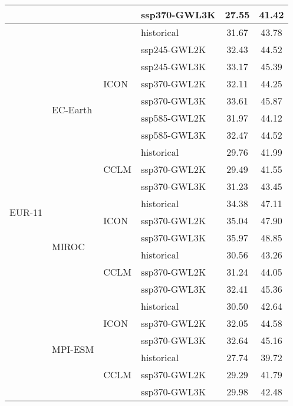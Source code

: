 \begin{table}[!htbp]
\begin{tabular}{lll|l|cc}
 &  &  & ssp370-GWL3K & 27.55 & 41.42 \\
\midrule
\multirow{22}{*}{EUR-11} & \multirow{10}{*}{EC-Earth} & \multirow{7}{*}{ICON} & historical & 31.67 & 43.78 \\
 &  &  & ssp245-GWL2K & 32.43 & 44.52 \\
 &  &  & ssp245-GWL3K & 33.17 & 45.39 \\
 &  &  & ssp370-GWL2K & 32.11 & 44.25 \\
 &  &  & ssp370-GWL3K & 33.61 & 45.87 \\
 &  &  & ssp585-GWL2K & 31.97 & 44.12 \\
 &  &  & ssp585-GWL3K & 32.47 & 44.52 \\
\cmidrule(lr){3-6}
 &  & \multirow{3}{*}{CCLM} & historical & 29.76 & 41.99 \\
 &  &  & ssp370-GWL2K & 29.49 & 41.55 \\
 &  &  & ssp370-GWL3K & 31.23 & 43.45 \\
\cmidrule(lr){3-6}
\cmidrule(lr){2-6}
 & \multirow{6}{*}{MIROC} & \multirow{3}{*}{ICON} & historical & 34.38 & 47.11 \\
 &  &  & ssp370-GWL2K & 35.04 & 47.90 \\
 &  &  & ssp370-GWL3K & 35.97 & 48.85 \\
\cmidrule(lr){3-6}
 &  & \multirow{3}{*}{CCLM} & historical & 30.56 & 43.26 \\
 &  &  & ssp370-GWL2K & 31.24 & 44.05 \\
 &  &  & ssp370-GWL3K & 32.41 & 45.36 \\
\cmidrule(lr){3-6}
\cmidrule(lr){2-6}
 & \multirow{6}{*}{MPI-ESM} & \multirow{3}{*}{ICON} & historical & 30.50 & 42.64 \\
 &  &  & ssp370-GWL2K & 32.05 & 44.58 \\
 &  &  & ssp370-GWL3K & 32.64 & 45.16 \\
\cmidrule(lr){3-6}
 &  & \multirow{3}{*}{CCLM} & historical & 27.74 & 39.72 \\
 &  &  & ssp370-GWL2K & 29.29 & 41.79 \\
 &  &  & ssp370-GWL3K & 29.98 & 42.48 \\
\bottomrule
\end{tabular}
\end{table}
